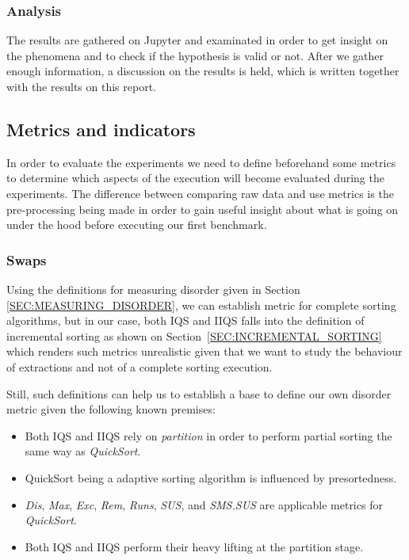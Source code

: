 \subsubsection{Analysis}
The results are gathered on Jupyter and examinated in order to get insight on the phenomena and to check if the hypothesis is valid or not. After we gather enough information, a discussion on the results is held, which is written together with the results on this report.

\subsection{Metrics and indicators}
In order to evaluate the experiments we need to define beforehand some metrics to determine which aspects of the execution will become evaluated during the experiments. The difference between comparing raw data and use metrics is the pre-processing being made in order to gain useful insight about what is going on under the hood before executing our first benchmark.

\subsubsection{Swaps}
Using the definitions for measuring disorder given in Section \ref{SEC:MEASURING_DISORDER}, we can establish metric for complete sorting algorithms, but in our case, both IQS and IIQS falls into the definition of incremental sorting as shown on Section~\ref{SEC:INCREMENTAL_SORTING} which renders such metrics unrealistic given that we want to study the behaviour of extractions and not of a complete sorting execution.

Still, such definitions can help us to establish a base to define our own disorder metric given the following known premises:

\begin{itemize}
    \item Both IQS and IIQS rely on \textit{partition} in order to perform partial sorting the same way as \textit{QuickSort}.
    \item QuickSort being a adaptive sorting algorithm is influenced by presortedness.
    \item \textit{Dis}, \textit{Max}, \textit{Exc}, \textit{Rem}, \textit{Runs}, \textit{SUS}, and \textit{SMS.SUS} are applicable metrics for \textit{QuickSort}.
    \item Both IQS and IIQS perform their heavy lifting at the partition stage.
\end{itemize}

